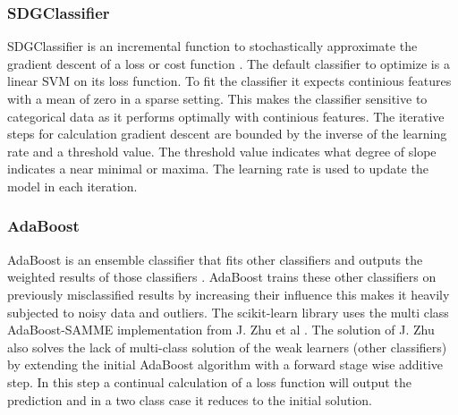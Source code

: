 \documentclass[a4paper,10pt]{article}
\begin{document}
\subsubsection{SDGClassifier}
SDGClassifier is an incremental function to stochastically approximate the gradient descent of a loss or cost function \cite{SGDClass}. The default classifier to optimize is a linear SVM on its loss function. To fit the classifier it expects continious features with a mean of zero in a sparse setting. This makes the classifier sensitive to categorical data as it performs optimally with continious features. The iterative steps for calculation gradient descent are bounded by the inverse of the learning rate and a threshold value. The threshold value indicates what degree of slope indicates a near minimal or maxima. The learning rate is used to update the model in each iteration.

\subsubsection{AdaBoost}
AdaBoost is an ensemble classifier that fits other classifiers and outputs the weighted results of those classifiers \cite{AdaBoost}. AdaBoost trains these other classifiers on previously misclassified results by increasing their influence this makes it heavily subjected to noisy data and outliers. The scikit-learn library uses the multi class AdaBoost-SAMME implementation from J. Zhu et al \cite{MadaB}. The solution of J. Zhu also solves the lack of multi-class solution of the weak learners (other classifiers) by extending the initial AdaBoost algorithm with a forward stage wise additive step. In this step a continual calculation of a loss function will output the prediction and in a two class case it reduces to the initial solution.
\end{document}
